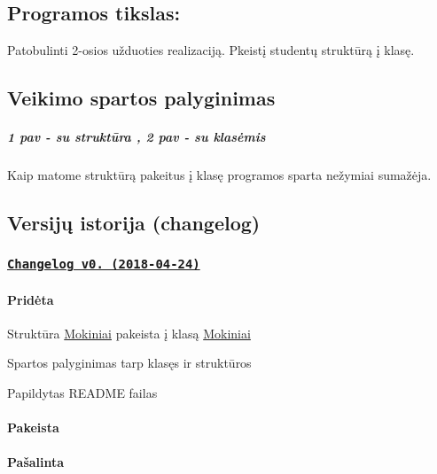 \subsection*{Programos tikslas\+:}


\begin{DoxyItemize}
\item Patobulinti 2-\/osios užduoties realizaciją. Pkeistį studentų struktūrą į klasę.
\end{DoxyItemize}

\subsection*{Veikimo spartos palyginimas}

  \subparagraph*{1 pav -\/ su struktūra , 2 pav -\/ su klasėmis}


\begin{DoxyItemize}
\item Kaip matome struktūrą pakeitus į klasę programos sparta nežymiai sumažėja.
\end{DoxyItemize}

\subsection*{Versijų istorija (changelog)}

\subsubsection*{\href{https://github.com/PauliusKu/OP-3/releases/tag/v0.1}{\tt Changelog v0. (2018-\/04-\/24)}}

\paragraph*{Pridėta}


\begin{DoxyItemize}
\item Struktūra \mbox{\hyperlink{class_mokiniai}{Mokiniai}} pakeista į klasą \mbox{\hyperlink{class_mokiniai}{Mokiniai}}
\item Spartos palyginimas tarp klasęs ir struktūros
\item Papildytas R\+E\+A\+D\+ME failas \paragraph*{Pakeista}
\end{DoxyItemize}

\paragraph*{Pašalinta}